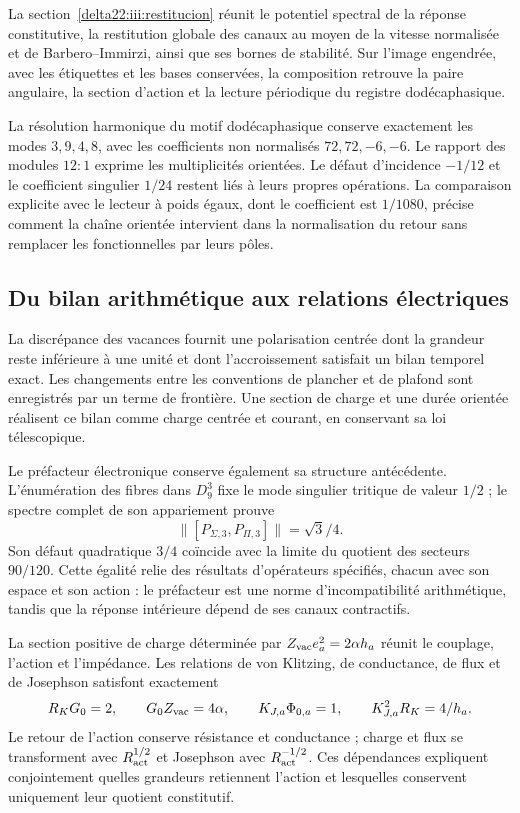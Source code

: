 \par
La section~\ref{delta22:iii:restitucion} réunit le potentiel spectral de la réponse constitutive, la restitution globale des canaux au moyen de la vitesse normalisée et de Barbero--Immirzi, ainsi que ses bornes de stabilité. Sur l’image engendrée, avec les étiquettes et les bases conservées, la composition retrouve la paire angulaire, la section d’action et la lecture périodique du registre dodécaphasique.

La résolution harmonique du motif dodécaphasique conserve exactement
les modes $3,9,4,8$, avec les coefficients non normalisés $72,72,-6,-6$.
Le rapport des modules $12:1$ exprime les multiplicités orientées.
Le défaut d’incidence $-1/12$ et le coefficient singulier $1/24$
restent liés à leurs propres opérations. La comparaison explicite
avec le lecteur à poids égaux, dont le coefficient est $1/1080$,
précise comment la chaîne orientée intervient dans la normalisation
du retour sans remplacer les fonctionnelles par leurs pôles.

\subsection*{Du bilan arithmétique aux relations électriques}

La discrépance des vacances fournit une polarisation centrée dont la
grandeur reste inférieure à une unité et dont l’accroissement satisfait
un bilan temporel exact. Les changements entre les conventions de
plancher et de plafond sont enregistrés par un terme de frontière. Une
section de charge et une durée orientée réalisent ce bilan comme
charge centrée et courant, en conservant sa loi télescopique.

Le préfacteur électronique conserve également sa structure antécédente.
L’énumération des fibres dans $D_9^3$ fixe le mode singulier tritique
de valeur $1/2$ ; le spectre complet de son appariement prouve
\[
\|[P_{\Sigma,3},P_{\Pi,3}]\|=\sqrt3/4.
\]
Son défaut quadratique $3/4$ coïncide avec la limite du quotient des
secteurs $90/120$. Cette égalité relie des résultats d’opérateurs
spécifiés, chacun avec son espace et son action : le préfacteur est
une norme d’incompatibilité arithmétique, tandis que la réponse
intérieure dépend de ses canaux contractifs.

La section positive de charge déterminée par
$Z_{\rm vac}e_a^2=2\alpha h_a$ réunit le couplage, l’action et
l’impédance. Les relations de von Klitzing, de conductance, de flux
et de Josephson satisfont exactement
\[
R_KG_0=2,\qquad G_0Z_{\rm vac}=4\alpha,\qquad
K_{J,a}\Phi_{0,a}=1,\qquad K_{J,a}^2R_K=4/h_a.
\]
Le retour de l’action conserve résistance et conductance ; charge et
flux se transforment avec $R_{\rm act}^{1/2}$ et Josephson avec
$R_{\rm act}^{-1/2}$. Ces dépendances expliquent conjointement
quelles grandeurs retiennent l’action et lesquelles conservent uniquement leur
quotient constitutif.


